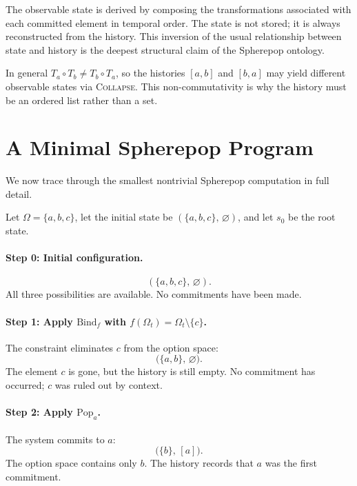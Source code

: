 \documentclass[12pt]{article}
\begin{document}
The observable state is derived by composing the transformations associated with each committed element in temporal order. The state is not stored; it is always reconstructed from the history. This inversion of the usual relationship between state and history is the deepest structural claim of the Spherepop ontology.

In general $T_a \circ T_b \neq T_b \circ T_a$, so the histories $[a,b]$ and $[b,a]$ may yield different observable states via \textsc{Collapse}. This non-commutativity is why the history must be an ordered list rather than a set.

\section{A Minimal Spherepop Program}
\label{sec:example}

We now trace through the smallest nontrivial Spherepop computation in full detail.

Let $\Omega = \{a, b, c\}$, let the initial state be $(\{a,b,c\},\, \varnothing)$, and let $s_0$ be the root state.

\paragraph{Step 0: Initial configuration.}
\[
(\{a,b,c\},\, \varnothing).
\]
All three possibilities are available. No commitments have been made.

\paragraph{Step 1: Apply $\mathrm{Bind}_f$ with $f(\Omega_t) = \Omega_t \setminus \{c\}$.}

The constraint eliminates $c$ from the option space:
\[
\bigl(\{a,b\},\, \varnothing\bigr).
\]
The element $c$ is gone, but the history is still empty. No commitment has occurred; $c$ was ruled out by context.

\paragraph{Step 2: Apply $\mathrm{Pop}_a$.}

The system commits to $a$:
\[
\bigl(\{b\},\, [a]\bigr).
\]
The option space contains only $b$. The history records that $a$ was the first commitment.
\end{document}

